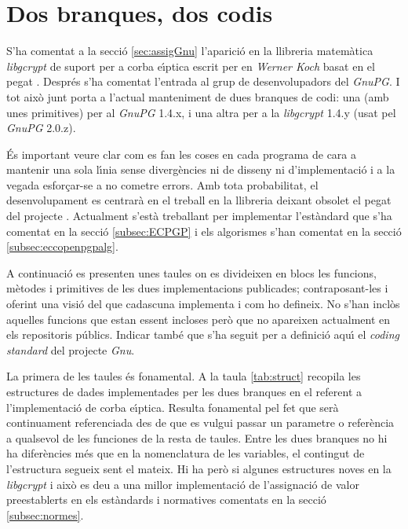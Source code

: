 \documentclass[12pt,twoside,catalan,a4paper]{book}%
\numberwithin{figure}{section}		%
\theoremstyle{definition}   			%
\def\ce{corba e\lgem{}\'{\i}ptica}%
\theoremstyle{saltolinea}   			%
\begin{document}
% 

\section{Dos branques, dos codis}\label{sec:branques}

S'ha comentat a la secci\'o \ref{sec:assigGnu} l'aparici\'o en la llibreria matem\`atica \emph{libgcrypt} de suport per a \ce{} escrit per en \emph{Werner Koch} basat en el pegat \cite{BM04}. Despr\'es s'ha comentat l'entrada al grup de desenvolupadors del \emph{GnuPG}. I tot aix\`o junt porta a l'actual manteniment de dues branques de codi: una (amb unes primitives) per al \emph{GnuPG} 1.4.x, i una altra per a la \emph{libgcrypt} 1.4.y (usat pel \emph{GnuPG} 2.0.z).

\'Es important veure clar com es fan les coses en cada programa de cara a mantenir una sola l\'{\i}nia sense diverg\`encies ni de disseny ni d'implementaci\'o i a la vegada esfor\c{c}ar-se a no cometre errors. Amb tota probabilitat, el desenvolupament es centrar\`a en el treball en la llibreria deixant obsolet el pegat del projecte \cite{BM04}. Actualment s'est\`a treballant per implementar l'est\`andard \cite{ECPGP} que s'ha comentat en la secci\'o \ref{subsec:ECPGP} i els algorismes s'han comentat en la secci\'o \ref{subsec:eccopenpgpalg}.

A continuaci\'o es presenten unes taules on es divideixen en blocs les funcions, m\`etodes i primitives de les dues implementacions publicades; contraposant-les i oferint una visi\'o del que cadascuna implementa i com ho defineix. No s'han incl\`os aquelles funcions que estan essent incloses per\`o que no apareixen actualment en els repositoris p\'ublics. Indicar tamb\'e que s'ha seguit per a definici\'o aqu\'{\i} el \emph{coding standard} del projecte \emph{Gnu}.

La primera de les taules \'es fonamental. A la taula \ref{tab:struct} recopila les estructures de dades implementades per les dues branques en el referent a l'implementaci\'o de \ce{}. Resulta fonamental pel fet que ser\`a continuament referenciada des de que es vulgui passar un parametre o refer\`encia a qualsevol de les funciones de la resta de taules. Entre les dues branques no hi ha difer\`encies m\'es que en la nomenclatura de les variables, el contingut de l'estructura segueix sent el mateix. Hi ha per\`o si algunes estructures noves en la \emph{libgcrypt} i aix\`o es deu a una millor implementaci\'o de l'assignaci\'o de valor preestablerts en els est\`andards i normatives comentats en la secci\'o \ref{subsec:normes}.
\end{document}

